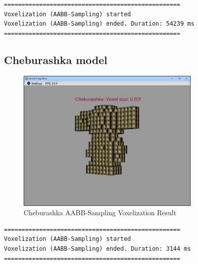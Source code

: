 \documentclass[12pt,a4paper,english]{article}
\begin{document}
\begin{verbatim}
==================================================
Voxelization (AABB-Sampling) started
Voxelization (AABB-Sampling) ended. Duration: 54239 ms
==================================================
\end{verbatim}

\subsection{Cheburashka model}

\begin{figure}[H]
    \centering
    \includegraphics[width=0.8\textwidth]{p3-3-cheburashka-aabb-sampling}
    \caption[]{Cheburashka AABB-Sampling Voxelization Result}
    \label{fig:p3-3-cheburashka-aabb-sampling}
\end{figure}

\begin{verbatim}
==================================================
Voxelization (AABB-Sampling) started
Voxelization (AABB-Sampling) ended. Duration: 3144 ms
==================================================
\end{verbatim}
\end{document}
